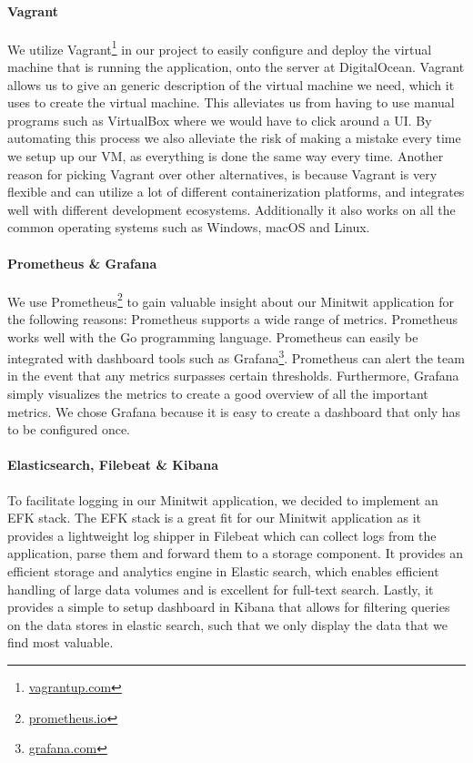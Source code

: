 \paragraph*{Vagrant}
We utilize Vagrant\footnote{\href{https://www.vagrantup.com/}{vagrantup.com}} in our project to easily configure and deploy the virtual machine that is running the application, onto the server at DigitalOcean. Vagrant allows us to give an generic description of the virtual machine we need, which it uses to create the virtual machine. This alleviates us from having to use manual programs such as VirtualBox where we would have to click around a UI. By automating this process we also alleviate the risk of making a mistake every time we setup up our VM, as everything is done the same way every time. Another reason for picking Vagrant over other alternatives, is because Vagrant is very flexible and can utilize a lot of different containerization platforms, and integrates well with different development ecosystems. Additionally it also works on all the common operating systems such as Windows, macOS and Linux.

\paragraph*{Prometheus \& Grafana}
We use Prometheus\footnote{\href{https://prometheus.io/}{prometheus.io}} to gain valuable insight about our Minitwit application for the following reasons: Prometheus supports a wide range of metrics. Prometheus works well with the Go programming language. Prometheus can easily be integrated with dashboard tools such as Grafana\footnote{\href{https://grafana.com/}{grafana.com}}. Prometheus can alert the team in the event that any metrics surpasses certain thresholds. Furthermore, Grafana simply visualizes the metrics to create a good overview of all the important metrics. We chose Grafana because it is easy to create a dashboard that only has to be configured once.

\paragraph*{Elasticsearch, Filebeat \& Kibana}
To facilitate logging in our Minitwit application, we decided to implement an EFK stack. The EFK stack is a great fit for our Minitwit application as it provides a lightweight log shipper in Filebeat which can collect logs from the application, parse them and forward them to a storage component. It provides an efficient storage and analytics engine in Elastic search, which enables efficient handling of large data volumes and is excellent for full-text search. Lastly, it provides a simple to setup dashboard in Kibana that allows for filtering queries on the data stores in elastic search, such that we only display the data that we find most valuable. 

